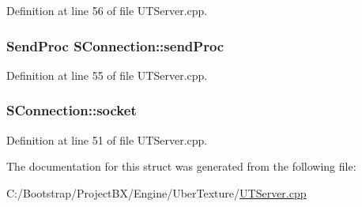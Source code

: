 Definition at line 56 of file UTServer.cpp.\hypertarget{struct_s_connection_34cae42592bcf485727a80ef5f4bfd0e}{
\subsubsection[{sendProc}]{\setlength{\rightskip}{0pt plus 5cm}SendProc {\bf SConnection::sendProc}}}
\label{struct_s_connection_34cae42592bcf485727a80ef5f4bfd0e}




Definition at line 55 of file UTServer.cpp.\hypertarget{struct_s_connection_2a1b0650f9af35d8d80ce21b2b46d8e3}{
\subsubsection[{socket}]{ {\bf SConnection::socket}}}
\label{struct_s_connection_2a1b0650f9af35d8d80ce21b2b46d8e3}




Definition at line 51 of file UTServer.cpp.

The documentation for this struct was generated from the following file:\begin{CompactItemize}
\item 
C:/Bootstrap/ProjectBX/Engine/UberTexture/\hyperlink{_u_t_server_8cpp}{UTServer.cpp}\end{CompactItemize}

